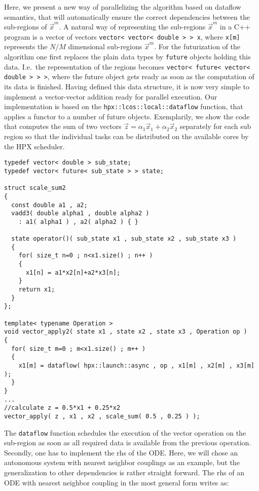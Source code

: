 \documentclass[10pt]{scrartcl}
\begin{document}
Here, we present a new way of parallelizing the algorithm based on dataflow semantics, that will automatically ensure the correct dependencies between the sub-regions of $\vec x^m$.
A natural way of representing the sub-regions $\vec x^m$ in a C++ program is a vector of vectors \lstinline+vector< vector< double > > x+, where \lstinline+x[m]+ represents the $N/M$ dimensional sub-regions $\vec x^m$.
For the futurization of the algorithm one first replaces the plain data types by \lstinline+future+ objects holding this data.
I.e.\ the representation of the regions becomes \lstinline+vector< future< vector< double > > >+, where the future object gets ready as soon as the computation of its data is finished.
Having defined this data structure, it is now very simple to implement a vector-vector addition ready for parallel execution.
Our implementation is based on the \lstinline+hpx::lcos::local::dataflow+ function, that applies a functor to a number of future objects.
Exemplarily, we show the code that computes the sum of two vectors $\vec z = \alpha_1 \vec x_1 + \alpha_2 \vec x_2$ separately for each sub region so that the individual tasks can be distributed on the available cores by the HPX scheduler.
\begin{lstlisting}
typedef vector< double > sub_state;
typedef vector< future< sub_state > > state;

struct scale_sum2
{
  const double a1 , a2;
  vadd3( double alpha1 , double alpha2 )
    : a1( alpha1 ) , a2( alpha2 ) { }
    
  state operator()( sub_state x1 , sub_state x2 , sub_state x3 )
  {
    for( size_t n=0 ; n<x1.size() ; n++ )
    {
      x1[n] = a1*x2[n]+a2*x3[n];
    }
    return x1;
  }
};

template< typename Operation >
void vector_apply2( state x1 , state x2 , state x3 , Operation op )
{
  for( size_t m=0 ; m<x1.size() ; m++ )
  {
    x1[m] = dataflow( hpx::launch::async , op , x1[m] , x2[m] , x3[m] );
  }
}
...
//calculate z = 0.5*x1 + 0.25*x2
vector_apply( z , x1 , x2 , scale_sum( 0.5 , 0.25 ) );
\end{lstlisting}
The \lstinline+dataflow+ function schedules the execution of the vector operation on the sub-region as soon as all required data is available from the previous operation.
Secondly, one has to implement the rhs of the ODE.
Here, we will chose an autonomous system with nearest neighbor couplings as an example, but the generalization to other dependencies is rather straight forward.
The rhs of an ODE with nearest neighbor coupling in the most general form writes as:
\end{document}
